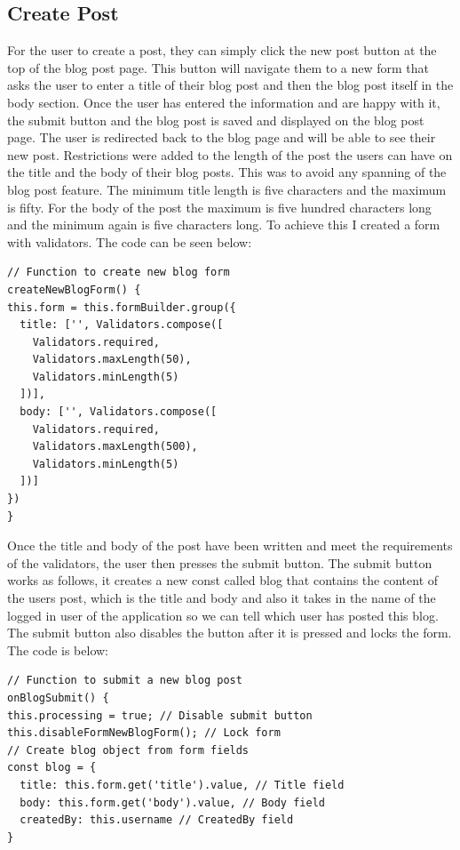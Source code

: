 \subsection{Create Post}
For the user to create a post, they can simply click the new post button at the top of the blog post page. This button will navigate them to a new form that asks the user to enter a title of their blog post and then the blog post itself in the body section. Once the user has entered the information and are happy with it, the submit button and the blog post is saved and displayed on the blog post page. The user is redirected back to the blog page and will be able to see their new post. Restrictions were added to the length of the post the users can have on the title and the body of their blog posts. This was to avoid any spanning of the blog post feature. The minimum title length is five characters and the maximum is fifty. For the body of the post the maximum is five hundred characters long and the minimum again is five characters long. To achieve this I created a form with validators. The code can be seen below:

\begin{lstlisting}
// Function to create new blog form
createNewBlogForm() {
this.form = this.formBuilder.group({
  title: ['', Validators.compose([
    Validators.required,
    Validators.maxLength(50),
    Validators.minLength(5)
  ])],
  body: ['', Validators.compose([
    Validators.required,
    Validators.maxLength(500),
    Validators.minLength(5)
  ])]
})
}
\end{lstlisting}

Once the title and body of the post have been written and meet the requirements of the validators, the user then presses the submit button. The submit button works as follows, it creates a new const called blog that contains the content of the users post, which is the title and body and also it takes in the name of the logged in user of the application so we can tell which user has posted this blog. The submit button also disables the button after it is pressed and locks the form. The code is below:

\begin{lstlisting}
// Function to submit a new blog post
onBlogSubmit() {
this.processing = true; // Disable submit button
this.disableFormNewBlogForm(); // Lock form
// Create blog object from form fields
const blog = {
  title: this.form.get('title').value, // Title field
  body: this.form.get('body').value, // Body field
  createdBy: this.username // CreatedBy field
}
\end{lstlisting}

